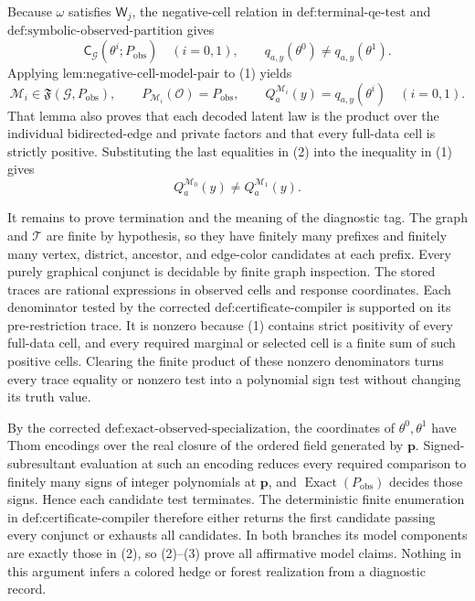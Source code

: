 Because \(\omega\) satisfies \(\mathsf W_j\), the negative-cell relation in \(\text{def:terminal-qe-test}\) and \(\text{def:symbolic-observed-partition}\) gives
\[
\mathsf C_{\mathcal G}(\theta^i;P_{\mathrm{obs}})
\quad(i=0,1),
\qquad
q_{a,y}(\theta^0)\neq q_{a,y}(\theta^1).
\tag{1}
\]
Applying \(\text{lem:negative-cell-model-pair}\) to (1) yields
\[
\mathcal M_i\in\mathfrak F(\mathcal G,P_{\mathrm{obs}}),
\qquad
P_{\mathcal M_i}(\mathcal O)=P_{\mathrm{obs}},
\qquad
Q_a^{\mathcal M_i}(y)=q_{a,y}(\theta^i)
\quad(i=0,1).
\tag{2}
\]
That lemma also proves that each decoded latent law is the product over the individual bidirected-edge and private factors and that every full-data cell is strictly positive. Substituting the last equalities in (2) into the inequality in (1) gives
\[
Q_a^{\mathcal M_0}(y)\neq Q_a^{\mathcal M_1}(y).
\tag{3}
\]

It remains to prove termination and the meaning of the diagnostic tag. The graph and \(\mathcal T\) are finite by hypothesis, so they have finitely many prefixes and finitely many vertex, district, ancestor, and edge-color candidates at each prefix. Every purely graphical conjunct is decidable by finite graph inspection. The stored traces are rational expressions in observed cells and response coordinates. Each denominator tested by the corrected \(\text{def:certificate-compiler}\) is supported on its pre-restriction trace. It is nonzero because (1) contains strict positivity of every full-data cell, and every required marginal or selected cell is a finite sum of such positive cells. Clearing the finite product of these nonzero denominators turns every trace equality or nonzero test into a polynomial sign test without changing its truth value.

By the corrected \(\text{def:exact-observed-specialization}\), the coordinates of \(\theta^0,\theta^1\) have Thom encodings over the real closure of the ordered field generated by \(\mathbf p\). Signed-subresultant evaluation at such an encoding reduces every required comparison to finitely many signs of integer polynomials at \(\mathbf p\), and \(\operatorname{Exact}(P_{\mathrm{obs}})\) decides those signs. Hence each candidate test terminates. The deterministic finite enumeration in \(\text{def:certificate-compiler}\) therefore either returns the first candidate passing every conjunct or exhausts all candidates. In both branches its model components are exactly those in (2), so (2)--(3) prove all affirmative model claims. Nothing in this argument infers a colored hedge or forest realization from a diagnostic record.